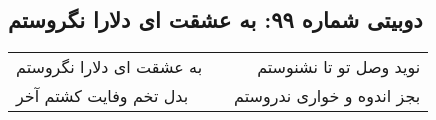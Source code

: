 \begin{center}
\section*{دوبیتی شماره ۹۹: به عشقت ای دلارا نگروستم}
\label{sec:099}
\begin{longtable}{l p{0.5cm} r}
به عشقت ای دلارا نگروستم
&&
نوید وصل تو تا نشنوستم
\\
بدل تخم وفایت کشتم آخر
&&
بجز اندوه و خواری ندروستم
\\
\end{longtable}
\end{center}
